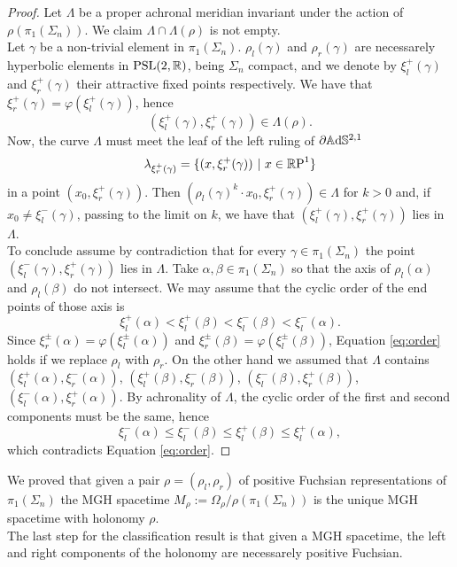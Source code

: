 \begin{proof} 
    Let $\Lambda$ be a proper achronal meridian invariant under the action of $\rho(\pi_1(\Sigma_n))$. We claim $\Lambda \cap \Lambda(\rho)$ is not empty.\\
    Let $\gamma$ be a non-trivial element in $\pi_1(\Sigma_n)$. $\rho_l(\gamma)$ and $\rho_r(\gamma)$ are necessarely hyperbolic elements in $\PSL$, being $\Sigma_n$ compact, and we denote by $\xi^+_l(\gamma)$ and $\xi^+_r(\gamma)$ their attractive fixed points respectively. We have that $\xi^+_r(\gamma) = \varphi(\xi^+_l(\gamma))$, hence
    \[
        (\xi^+_l(\gamma), \xi^+_r(\gamma)) \in \Lambda(\rho).
    \]
    Now, the curve $\Lambda$ must meet the leaf of the left ruling of $\partial \A^{2,1}$
    \[
        \lambda_{\xi^+_r(\gamma)} = \{ (x, \xi^+_r(\gamma)) \ | \ x\in \S \}
    \]
    in a point $(x_0, \xi^+_r(\gamma))$. Then $(\rho_l(\gamma)^k \cdot x_0 ,\xi^+_r(\gamma)) \in \Lambda$ for $k>0$ and, if $x_0\neq \xi^-_l(\gamma)$, passing to the limit on $k$, we have that $(\xi^+_l(\gamma),\xi^+_r(\gamma))$ lies in $\Lambda$.\\
    To conclude assume by contradiction that for every $\gamma \in \pi_1(\Sigma_n)$ the point $(\xi^-_l(\gamma),\xi^+_r(\gamma))$ lies in $\Lambda$. Take $\alpha , \beta \in \pi_1(\Sigma_n)$ so that the axis of $\rho_l(\alpha)$ and $\rho_l(\beta)$ do not intersect. We may assume that the cyclic order of the end points of those axis is
    \begin{equation}\label{eq:order}
        \xi^+_l(\alpha) < \xi^+_l(\beta) < \xi^-_l(\beta) < \xi^-_l(\alpha).
    \end{equation}
    Since $\xi^\pm_r(\alpha) = \varphi(\xi^\pm_l(\alpha))$ and $\xi^\pm_r(\beta) = \varphi(\xi^\pm_l(\beta))$, Equation \ref{eq:order} holds if we replace $\rho_l$ with $\rho_r$.
    On the other hand we assumed that $\Lambda$ contains $(\xi^+_l(\alpha), \xi^-_r(\alpha))$, $(\xi^+_l(\beta), \xi^-_r(\beta))$, $(\xi^-_l(\beta), \xi^+_r(\beta))$, $(\xi^-_l(\alpha), \xi^+_r(\alpha))$. By achronality of $\Lambda$, the cyclic order of the first and second components must be the same, hence
    \[
        \xi^-_l(\alpha) \leq \xi^-_l(\beta) \leq \xi^+_l(\beta) \leq \xi^+_l(\alpha),
    \]
    which contradicts Equation \ref{eq:order}.
\end{proof}
We proved that given a pair $\rho = (\rho_l,\rho_r)$ of positive Fuchsian representations of $\pi_1(\Sigma_n)$ the MGH spacetime $M_\rho := \Omega_\rho / \rho(\pi_1(\Sigma_n))$ is the unique MGH spacetime with holonomy $\rho$.\\
The last step for the classification result is that given a MGH spacetime, the left and right components of the holonomy are necessarely positive Fuchsian.

